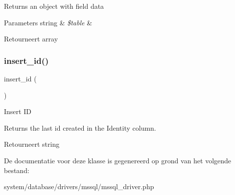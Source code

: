 Returns an object with field data


\begin{DoxyParams}[1]{Parameters}
string & {\em \$table} & \\
\hline
\end{DoxyParams}
\begin{DoxyReturn}{Retourneert}
array 
\end{DoxyReturn}
\mbox{\label{class_c_i___d_b__mssql__driver_a933f2cde8dc7f87875e257d0a4902e99}} 
\subsubsection{\texorpdfstring{insert\_id()}{insert\_id()}}
{\footnotesize\ttfamily insert\+\_\+id (\begin{DoxyParamCaption}{ }\end{DoxyParamCaption})}

Insert ID

Returns the last id created in the Identity column.

\begin{DoxyReturn}{Retourneert}
string 
\end{DoxyReturn}


De documentatie voor deze klasse is gegenereerd op grond van het volgende bestand\+:\begin{DoxyCompactItemize}
\item 
system/database/drivers/mssql/mssql\+\_\+driver.\+php\end{DoxyCompactItemize}

